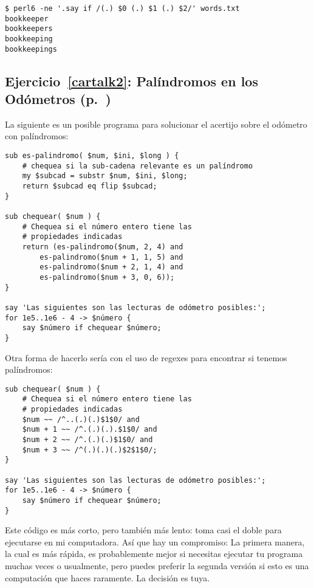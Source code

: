 \begin{verbatim}
$ perl6 -ne '.say if /(.) $0 (.) $1 (.) $2/' words.txt
bookkeeper
bookkeepers
bookkeeping
bookkeepings
\end{verbatim}

\subsection{Ejercicio~\ref{cartalk2}: Palíndromos en los Odómetros (p.~\pageref{cartalk2})}
\label{sol_cartalk2}

La siguiente es un posible programa para solucionar
el acertijo sobre el odómetro con palíndromos:

\begin{verbatim}
sub es-palindromo( $num, $ini, $long ) {
    # chequea si la sub-cadena relevante es un palíndromo
    my $subcad = substr $num, $ini, $long;
    return $subcad eq flip $subcad;
}
    
sub chequear( $num ) {
    # Chequea si el número entero tiene las
    # propiedades indicadas
    return (es-palindromo($num, 2, 4) and
        es-palindromo($num + 1, 1, 5) and
        es-palindromo($num + 2, 1, 4) and
        es-palindromo($num + 3, 0, 6));
}

say 'Las siguientes son las lecturas de odómetro posibles:';
for 1e5..1e6 - 4 -> $número {
    say $número if chequear $número;
}
\end{verbatim}

Otra forma de hacerlo sería con el uso de regexes para 
encontrar si tenemos palíndromos:

\begin{verbatim}
sub chequear( $num ) {
    # Chequea si el número entero tiene las
	# propiedades indicadas
    $num ~~ /^..(.)(.)$1$0/ and 
    $num + 1 ~~ /^.(.)(.).$1$0/ and 
    $num + 2 ~~ /^.(.)(.)$1$0/ and 
    $num + 3 ~~ /^(.)(.)(.)$2$1$0/;
}

say 'Las siguientes son las lecturas de odómetro posibles:';
for 1e5..1e6 - 4 -> $número {
	say $número if chequear $número;
}
\end{verbatim}

Este código es más corto, pero también más lento: toma casi el 
doble para ejecutarse en mi computadora. Así que hay un compromiso:
La primera manera, la cual es más rápida, es probablemente mejor
si necesitas ejecutar tu programa muchas veces o usualmente, pero puedes
preferir la segunda versión si esto es una computación que haces
raramente. La decisión es tuya.


